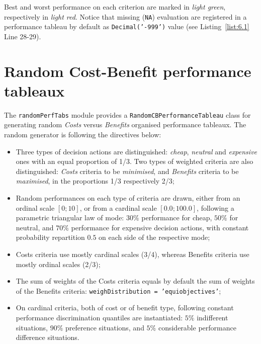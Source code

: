 Best and worst performance on each criterion are marked in \emph{light green}, respectively in \emph{light red}. Notice that missing (\texttt{NA}) evaluation are registered in a performance tableau by default as \texttt{Decimal('-999')} value (see Listing~\vref{list:6.1} Line 28-29).	    

\section{Random Cost-Benefit performance tableaux}
\label{sec:6.3}

The \texttt{randomPerfTabs} module provides a \texttt{RandomCBPerformanceTableau} class for generating random \emph{Costs} versus \emph{Benefits} organised performance tableaux. The random generator is following the directives below:
\begin{itemize}[leftmargin=0.5cm,rightmargin=0.25cm]
\item Three types of decision actions are distinguished: \emph{cheap}, \emph{neutral} and \emph{expensive} ones with an equal proportion of 1/3. Two types of weighted criteria are also distinguished: \emph{Costs} criteria to be \emph{minimised}, and \emph{Benefits} criteria to be \emph{maximised}, in the proportions 1/3 respectively 2/3;
\item  Random performances on each type of criteria  are drawn, either from an ordinal scale $[0;10]$, or from a cardinal scale $[0.0;100.0]$, following a parametric triangular law of mode: $30\%$ performance for cheap, $50\%$ for neutral, and $70\%$ performance for expensive decision actions, with constant probability repartition $0.5$ on each side of the respective mode;
\item Costs criteria use mostly cardinal scales (3/4), whereas Benefits criteria use mostly ordinal scales (2/3); 
\item  The sum of weights of the Costs criteria equals by default the sum of weights of the Benefits criteria: \texttt{weighDistribution = 'equiobjectives'};
\item On cardinal criteria, both of cost or of benefit type, following constant performance discrimination quantiles are instantiated: $5\%$ indifferent situations, $90\%$ preference situations, and $5\%$ considerable performance difference situations. 
\end{itemize}

